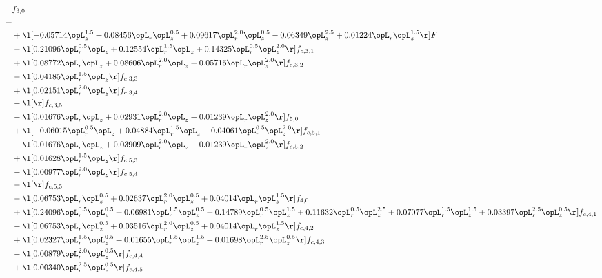 \begin{alignat}{2} 
\label{eq:f_30_2} 
& f_{3,0} \nonumber \\ 
 = \\ 
& + \l[  -0.05714 \opL_z^{1.5} +  0.08456 \opL_r \opL_z^{0.5} +  0.09617 \opL_r^{2.0} \opL_z^{0.5}   -0.06349 \opL_z^{2.5} +  0.01224 \opL_r \opL_z^{1.5}  \r] F \nonumber \\ 
& - \l[  0.21096 \opL_r^{0.5} \opL_z +  0.12554 \opL_r^{1.5} \opL_z +  0.14325 \opL_r^{0.5} \opL_z^{2.0}  \r] f_{c,3,1} \nonumber \\ 
& + \l[  0.08772 \opL_r \opL_z +  0.08606 \opL_r^{2.0} \opL_z +  0.05716 \opL_r \opL_z^{2.0}  \r] f_{c,3,2} \nonumber \\ 
& - \l[  0.04185 \opL_r^{1.5} \opL_z  \r] f_{c,3,3} \nonumber \\ 
& + \l[  0.02151 \opL_r^{2.0} \opL_z  \r] f_{c,3,4} \nonumber \\ 
& - \l[  \r] f_{c,3,5} \nonumber \\ 
& - \l[  0.01676 \opL_r \opL_z +  0.02931 \opL_r^{2.0} \opL_z +  0.01239 \opL_r \opL_z^{2.0}  \r] f_{5,0} \nonumber \\ 
& + \l[  -0.06015 \opL_r^{0.5} \opL_z +  0.04884 \opL_r^{1.5} \opL_z   -0.04061 \opL_r^{0.5} \opL_z^{2.0}  \r] f_{c,5,1} \nonumber \\ 
& - \l[  0.01676 \opL_r \opL_z +  0.03909 \opL_r^{2.0} \opL_z +  0.01239 \opL_r \opL_z^{2.0}  \r] f_{c,5,2} \nonumber \\ 
& + \l[  0.01628 \opL_r^{1.5} \opL_z  \r] f_{c,5,3} \nonumber \\ 
& - \l[  0.00977 \opL_r^{2.0} \opL_z  \r] f_{c,5,4} \nonumber \\ 
& - \l[  \r] f_{c,5,5} \nonumber \\ 
& - \l[  0.06753 \opL_r \opL_z^{0.5} +  0.02637 \opL_r^{2.0} \opL_z^{0.5} +  0.04014 \opL_r \opL_z^{1.5}  \r] f_{4,0} \nonumber \\ 
& + \l[  0.24096 \opL_r^{0.5} \opL_z^{0.5} +  0.06981 \opL_r^{1.5} \opL_z^{0.5} +  0.14789 \opL_r^{0.5} \opL_z^{1.5} +  0.11632 \opL_r^{0.5} \opL_z^{2.5} +  0.07077 \opL_r^{1.5} \opL_z^{1.5} +  0.03397 \opL_r^{2.5} \opL_z^{0.5}  \r] f_{c,4,1} \nonumber \\ 
& - \l[  0.06753 \opL_r \opL_z^{0.5} +  0.03516 \opL_r^{2.0} \opL_z^{0.5} +  0.04014 \opL_r \opL_z^{1.5}  \r] f_{c,4,2} \nonumber \\ 
& + \l[  0.02327 \opL_r^{1.5} \opL_z^{0.5} +  0.01655 \opL_r^{1.5} \opL_z^{1.5} +  0.01698 \opL_r^{2.5} \opL_z^{0.5}  \r] f_{c,4,3} \nonumber \\ 
& - \l[  0.00879 \opL_r^{2.0} \opL_z^{0.5}  \r] f_{c,4,4} \nonumber \\ 
& + \l[  0.00340 \opL_r^{2.5} \opL_z^{0.5}  \r] f_{c,4,5} \nonumber \\ 
\end{alignat} 


